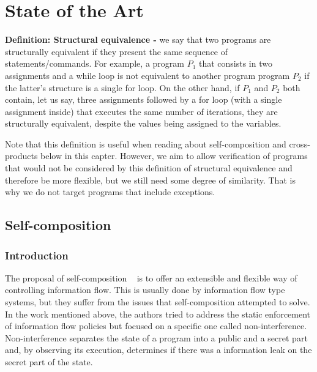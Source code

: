 
%

\makeatletter
\newcommand{\ntifpkgloaded}{%
  \@ifpackageloaded%
}
\makeatother


\chapter{State of the Art}
\label{cha:state_of_the_art}

\textbf{Definition: Structural equivalence -} we say that two programs are structurally equivalent if they present the same sequence of statements/commands.
For example, a program \emph{$P_1$} that consists in two assignments and a while loop is not equivalent to another program program \emph{$P_2$} if the latter's structure is a single for loop.
On the other hand, if \emph{$P_1$} and \emph{$P_2$} both contain, let us say, three assignments followed by a for loop (with a single assignment inside) that executes the same number of iterations, they are structurally equivalent, despite the values being assigned to the variables.

Note that this definition is useful when reading about self-composition and cross-products below in this capter.
However, we aim to allow verification of programs that would not be considered by this definition of structural equivalence and therefore be more flexible, but we still need some degree of similarity.
That is why we do not target programs that include exceptions.


\section{Self-composition} 
\label{sec:self_composition}

\subsection{Introduction}
\label{subsec:self_composition_intro}

The proposal of self-composition ~\cite{DBLP:conf/csfw/BartheDR04} is to offer an extensible and flexible way of controlling information flow.
This is usually done by information flow type systems, but they suffer from the issues that self-composition attempted to solve.
In the work mentioned above, the authors tried to address the static enforcement of information flow policies but focused on a specific one called non-interference.
Non-interference separates the state of a program into a public and a secret part and, by observing its execution, determines if there was a information leak on the secret part of the state.

